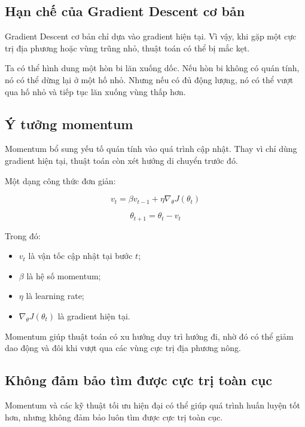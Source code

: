 \subsection{Hạn chế của Gradient Descent cơ bản}

Gradient Descent cơ bản chỉ dựa vào gradient hiện tại. Vì vậy, khi gặp một cực trị địa phương hoặc vùng trũng nhỏ, thuật toán có thể bị mắc kẹt.

Ta có thể hình dung một hòn bi lăn xuống dốc. Nếu hòn bi không có quán tính, nó có thể dừng lại ở một hố nhỏ. Nhưng nếu có đủ động lượng, nó có thể vượt qua hố nhỏ và tiếp tục lăn xuống vùng thấp hơn.

\subsection{Ý tưởng momentum}

Momentum bổ sung yếu tố quán tính vào quá trình cập nhật. Thay vì chỉ dùng gradient hiện tại, thuật toán còn xét hướng di chuyển trước đó.

Một dạng công thức đơn giản:

\[
    v_t = \beta v_{t-1} + \eta \nabla_{\theta}J(\theta_t)
\]

\[
    \theta_{t+1} = \theta_t - v_t
\]

Trong đó:

\begin{itemize}
    \item $v_t$ là vận tốc cập nhật tại bước $t$;
    \item $\beta$ là hệ số momentum;
    \item $\eta$ là learning rate;
    \item $\nabla_{\theta}J(\theta_t)$ là gradient hiện tại.
\end{itemize}

\begin{ghinho}
Momentum giúp thuật toán có xu hướng duy trì hướng đi, nhờ đó có thể giảm dao động và đôi khi vượt qua các vùng cực trị địa phương nông.
\end{ghinho}

\subsection{Không đảm bảo tìm được cực trị toàn cục}

Momentum và các kỹ thuật tối ưu hiện đại có thể giúp quá trình huấn luyện tốt hơn, nhưng không đảm bảo luôn tìm được cực trị toàn cục.

